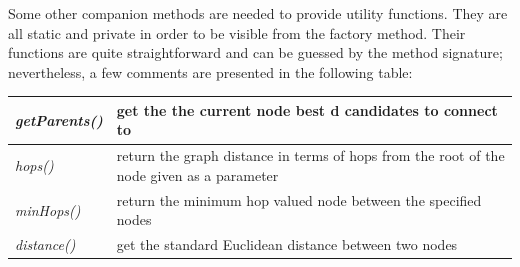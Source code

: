 \documentclass[a4paper,12pt]{article}
\begin{document}
Some other companion methods are needed to provide utility
functions. They are all static and private in order to be visible from
the factory method. Their functions are quite straightforward and can 
be guessed by the method signature; nevertheless, a few comments are 
presented in the following table:

\begin{center}
\begin{tabular}{|l|p{4in}|}
\hline
\emph{getParents()} & get the the current node best d candidates to 
connect to\\
\hline
\emph{hops()} & return the graph distance in terms of hops from the 
root of the node given as a parameter\\
\hline
\emph{minHops()} & return the minimum hop valued node between the 
specified nodes\\
\hline
\emph{distance()} & get the standard Euclidean distance between two nodes\\
\hline
\end{tabular}
\end{center}
\end{document}
